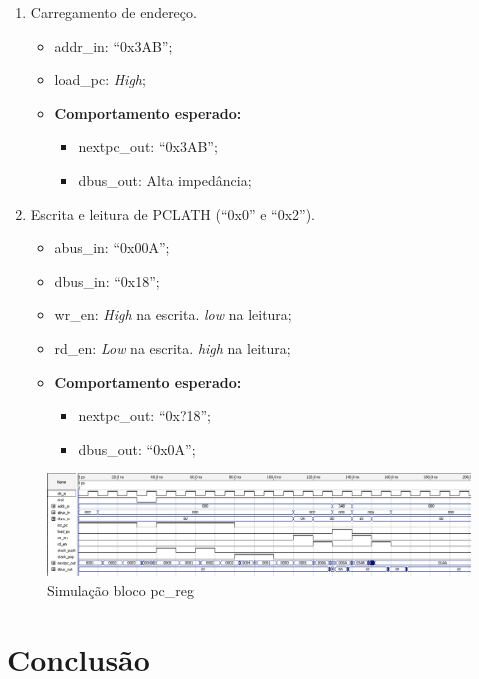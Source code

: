 \documentclass{article}
\begin{document}
\begin{enumerate}
    \item Carregamento de endereço.
    \begin{itemize}
        \item addr\_in: ``0x3AB'';
        \item load\_pc: \textit{High};
        \item \textbf{Comportamento esperado:}
        \begin{itemize}
            \item nextpc\_out: ``0x3AB'';
            \item dbus\_out: Alta impedância;
        \end{itemize}
    \end{itemize}

    \item Escrita e leitura de PCLATH (``0x0'' e ``0x2'').
    \begin{itemize}
        \item abus\_in: ``0x00A'';
        \item dbus\_in: ``0x18'';
        \item wr\_en: \textit{High} na escrita. \textit{low} na leitura;
        \item rd\_en: \textit{Low} na escrita. \textit{high} na leitura;
        \item \textbf{Comportamento esperado:}
        \begin{itemize}
            \item nextpc\_out: ``0x?18'';
            \item dbus\_out: ``0x0A'';
        \end{itemize}
    \end{itemize}
\end{enumerate}

\begin{figure}[ht]
    \begin{center}
        \includegraphics[width=15cm]{images/pc_reg.png}
        \caption{Simulação bloco pc\_reg}
\end{center}
\end{figure}

\section{Conclusão}
\end{document}
